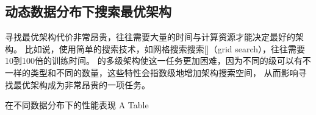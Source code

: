 \subsection{动态数据分布下搜索最优{\li}架构}

寻找最优{\li}架构代价非常昂贵，往往需要大量的时间与计算资源才能决定最好的{\li}架构。
比如说，使用简单的搜索技术，如网格搜索搜索[]（grid search），往往需要10到100倍的训练时间。
{\li}的多级架构使这一任务更加困难，因为不同的级可以有不一样的{\model}类型和不同的{\model}数量，这些特性会指数级地增加架构搜索空间，
从而影响寻找最优{\li}架构成为非常昂贵的一项任务。

% 

\begin{table}[!hpb]
  \centering
  \bicaption[指向一个表格的表目录索引]
    {{\li}在不同数据分布下的性能表现}
    {A Table}
  \label{tab:dist}
  \begin{tabular}{@{}llr@{}} \toprule
  \end{tabular}
\end{table}

